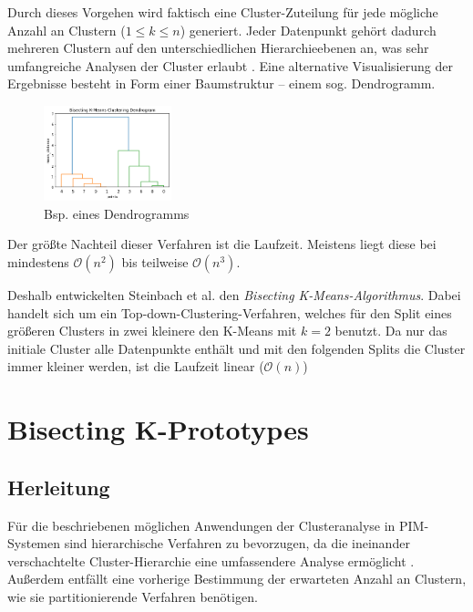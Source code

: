 Durch dieses Vorgehen wird faktisch eine Cluster-Zuteilung für jede
mögliche Anzahl an Clustern (\(1 \leq k \leq n\)) generiert. Jeder
Datenpunkt gehört dadurch mehreren Clustern auf den unterschiedlichen
Hierarchieebenen an, was sehr umfangreiche Analysen der Cluster erlaubt
\autocite{dogan2022}. Eine alternative Visualisierung der Ergebnisse
besteht in Form einer Baumstruktur -- einem sog. Dendrogramm.
\autocite{steinbach2000}

\begin{figure}
\centering
\includegraphics[width=0.33\textwidth,height=\textheight]{img/dengrogram-example.png}
\caption{Bsp. eines Dendrogramms}
\end{figure}

Der größte Nachteil dieser Verfahren ist die Laufzeit. Meistens liegt
diese bei mindestens \(\mathcal{O}(n^2)\) bis teilweise
\(\mathcal{O}(n^3)\). \autocite{dogan2022}

Deshalb entwickelten Steinbach et al. \autocite{steinbach2000} den
\emph{Bisecting K-Means-Algorithmus}. Dabei handelt sich um ein
Top-down-Clustering-Verfahren, welches für den Split eines größeren
Clusters in zwei kleinere den K-Means mit \(k=2\) benutzt. Da nur das
initiale Cluster alle Datenpunkte enthält und mit den folgenden Splits
die Cluster immer kleiner werden, ist die Laufzeit linear
(\(\mathcal{O}(n)\))

\hypertarget{bisecting-k-prototypes}{%
\section{Bisecting K-Prototypes}\label{bisecting-k-prototypes}}

\hypertarget{herleitung}{%
\subsection{Herleitung}\label{herleitung}}

Für die beschriebenen möglichen Anwendungen der Clusteranalyse in
PIM-Systemen sind hierarchische Verfahren zu bevorzugen, da die
ineinander verschachtelte Cluster-Hierarchie eine umfassendere Analyse
ermöglicht \autocite{dogan2022}. Außerdem entfällt eine vorherige
Bestimmung der erwarteten Anzahl an Clustern, wie sie partitionierende
Verfahren benötigen.

